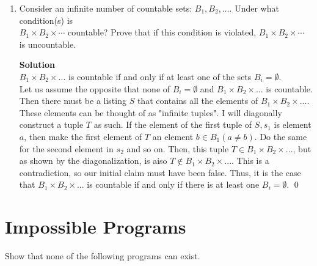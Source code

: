 \documentclass[11pt]{article}
\newcommand*{\Question}[1]{\section{#1}}
\newenvironment{Parts}{\begin{enumerate}[label=(\alph*)]}{\end{enumerate}}
\newcommand*{\Part}{\item}
\begin{document}
\begin{Parts}
    \Part Consider an infinite number of countable sets: $B_1, B_2, \dots$. Under what
    condition(s) is \\$B_1 \times B_2 \times \cdots$ countable? Prove that if this
    condition is violated, $B_1 \times B_2 \times \cdots$ is uncountable.
\begin{mdframed} \textbf{Solution} \\
$B_1 \times B_2 \times ...$ is countable if and only if at least one of the sets $B_i=\emptyset$. \\
Let us assume the opposite that none of $B_i=\emptyset$ and $B_1 \times B_2 \times ...$ is countable. Then there must be a listing $S$ that contains all the elements of $B_1 \times B_2 \times ...$. These elements can be thought of as "infinite tuples". I will diagonally construct a tuple $T$ as such. If the element of the first tuple of $S, s_1$ is element $a$, then make the first element of $T$ an element $b \in B_1(a \neq b)$. Do the same for the second element in $s_2$ and so on. Then, this tuple $T \in B_1 \times B_2 \times ...$, but as shown by the diagonalization, is aiso $T \not \in B_1 \times B_2 \times ...$. This is a contradiction, so our initial claim must have been false. Thus, it is the case that $B_1 \times B_2 \times ...$ is countable if and only if there is at least one $B_i=\emptyset$. \qed
\end{mdframed}

\end{Parts}

\Question{Impossible Programs}

Show that none of the following programs can exist.
\end{document}
